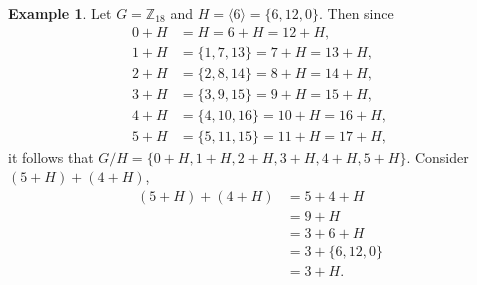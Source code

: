 \documentclass{article}
\theoremstyle{definition}
\newtheorem{example}{Example}[section]
\begin{document}
     \begin{example}
        Let $G=\mathbb{Z}_{18}$ and $H=\langle 6 \rangle = \{6,12,0\}$. Then since
        \begin{align*}
            0 + H &= H = 6 + H = 12 + H, \\
            1 + H &= \{1, 7, 13 \} = 7 + H = 13 + H, \\
            2 + H &= \{ 2, 8, 14 \} = 8+H = 14+H, \\
            3 + H &= \{ 3, 9, 15 \} = 9+H = 15+H, \\
            4 + H &= \{ 4, 10, 16 \} = 10+H = 16+H, \\
            5 + H &= \{ 5, 11, 15 \} = 11+H = 17+H,
        \end{align*}
        it follows that $G/H = \{0+H,1+H,2+H,3+H,4+H,5+H\}$. Consider $(5+H)+(4+H)$,
        \begin{align*}
            (5+H)+(4+H) &= 5+4+H \\
            &= 9+H \\
            &= 3+6+H \\
            &= 3+\{6,12,0\} \\
            &= 3+H.
        \end{align*}
     \end{example}
     
\end{document}
